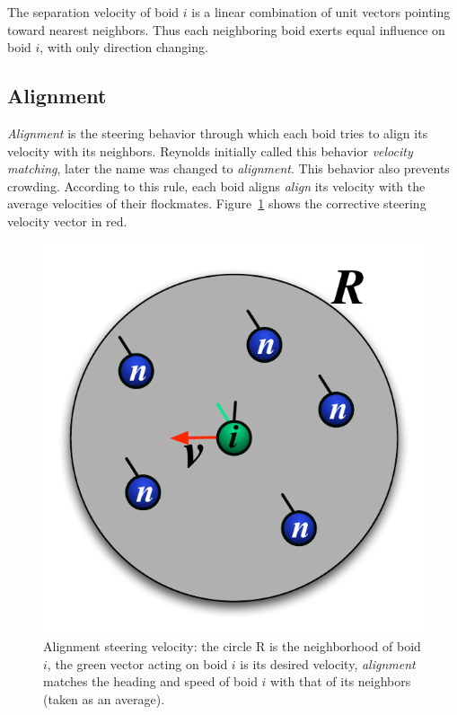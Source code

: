 The separation velocity of boid $i$ is a linear combination of unit vectors pointing toward nearest neighbors. Thus each neighboring boid exerts equal influence on boid $i$, with only direction changing. 

\subsection{Alignment}
\textit{Alignment} is the steering behavior through which each boid tries to align its velocity with its neighbors. Reynolds initially called this behavior \textit{velocity matching}, later the name was changed to \textit{alignment}. This behavior also prevents crowding. According to this rule, each boid aligns \textit{align} its velocity with the average velocities of their flockmates. Figure~\ref{alignmentPDF} shows the corrective steering velocity vector in red.

\begin{figure}[htbp]
\begin{center}
\includegraphics[scale=0.85]{figures/alignment.pdf}
\caption{Alignment steering velocity: the circle R is the neighborhood of boid $i$, the green vector acting on boid $i$ is its desired velocity, \textit{alignment} matches the heading and speed of boid $i$ with that of its neighbors (taken as an average).}
\label{alignmentPDF}
\end{center}
\end{figure}

